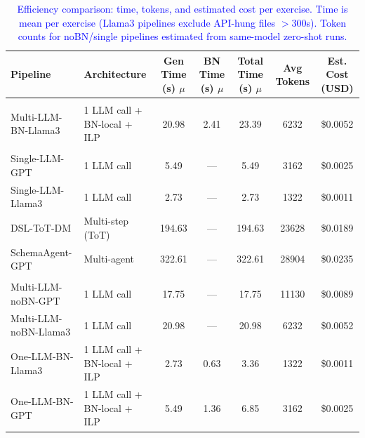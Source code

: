 \begin{table}[t]
\centering
\caption{\textcolor{blue}{Efficiency comparison: time, tokens, and estimated cost per exercise.
Time is mean per exercise (Llama3 pipelines exclude API-hung files $>$300s).
Token counts for noBN/single pipelines estimated from same-model zero-shot runs.}}
\label{tab:cost_analysis_pipelines}
\scriptsize
\setlength{\tabcolsep}{3pt}
\begin{tabular}{llccccc}
\toprule
\textbf{Pipeline}
& \textbf{Architecture}
& \textbf{Gen Time (s)} $\mu$
& \textbf{BN Time (s)} $\mu$
& \textbf{Total Time (s)} $\mu$
& \textbf{Avg Tokens}
& \textbf{Est. Cost (USD)} \\
\midrule
\rowcolor{gray!15}
\multicolumn{7}{@{}l}{\textit{Our Approach}} \\
Multi-LLM-BN-Llama3 & 1 LLM call + BN-local + ILP & 20.98 & 2.41 & 23.39 & 6232 & \$0.0052 \\
\midrule
\rowcolor{gray!15}
\multicolumn{7}{@{}l}{\textit{Baselines}} \\
Single-LLM-GPT & 1 LLM call & 5.49 & --- & 5.49 & 3162 & \$0.0025 \\
Single-LLM-Llama3 & 1 LLM call & 2.73 & --- & 2.73 & 1322 & \$0.0011 \\
DSL-ToT-DM & Multi-step (ToT) & 194.63 & --- & 194.63 & 23628 & \$0.0189 \\
SchemaAgent-GPT & Multi-agent & 322.61 & --- & 322.61 & 28904 & \$0.0235 \\
\midrule
\rowcolor{gray!15}
\multicolumn{7}{@{}l}{\textit{Variants}} \\
Multi-LLM-noBN-GPT & 1 LLM call & 17.75 & --- & 17.75 & 11130 & \$0.0089 \\
Multi-LLM-noBN-Llama3 & 1 LLM call & 20.98 & --- & 20.98 & 6232 & \$0.0052 \\
One-LLM-BN-Llama3 & 1 LLM call + BN-local + ILP & 2.73 & 0.63 & 3.36 & 1322 & \$0.0011 \\
One-LLM-BN-GPT & 1 LLM call + BN-local + ILP & 5.49 & 1.36 & 6.85 & 3162 & \$0.0025 \\
\bottomrule
\end{tabular}
\end{table}
